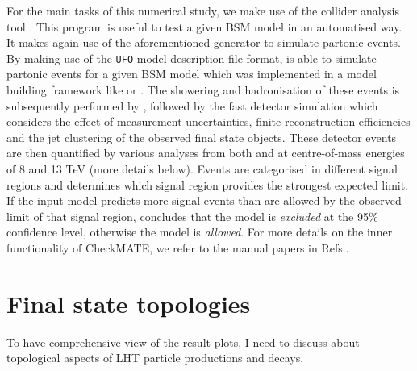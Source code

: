 For the main tasks of this numerical study, we make use of the collider analysis tool \Checkmate{} \cite{??}. 
This program is useful to test a given BSM model in an automatised way. 
It makes again use of the aforementioned  generator \Madgraph to simulate partonic events. 
By making use of the \texttt{UFO} model description file format, \Madgraph is able to 
simulate partonic events for a given BSM model which was implemented in a model building framework
 like \Feynrules or \Sarah. The showering and hadronisation of these events is
 subsequently performed by \Pythia, followed by the fast detector simulation \Delphes
 which considers the effect of measurement uncertainties, finite reconstruction efficiencies 
and the jet clustering of the observed final state objects. 
These detector events are then quantified by various analyses from both \Atlas and \Cms
at centre-of-mass energies of 8 and 13 TeV (more details below). 
Events are categorised in different signal regions and \Checkmate{} determines 
which signal region provides the strongest expected limit. 
If the input model predicts more signal events than are allowed by the observed limit of 
that signal region, \Checkmate{} concludes that the model is \emph{excluded} at the 95\% confidence level, 
otherwise the model is \emph{allowed}. 
For more details on the inner functionality of CheckMATE, we refer to the manual papers in Refs.\cite{??}. 




\section{Final state topologies}

To have comprehensive view of the result plots, 
I need to discuss about topological aspects of LHT particle productions and decays.


